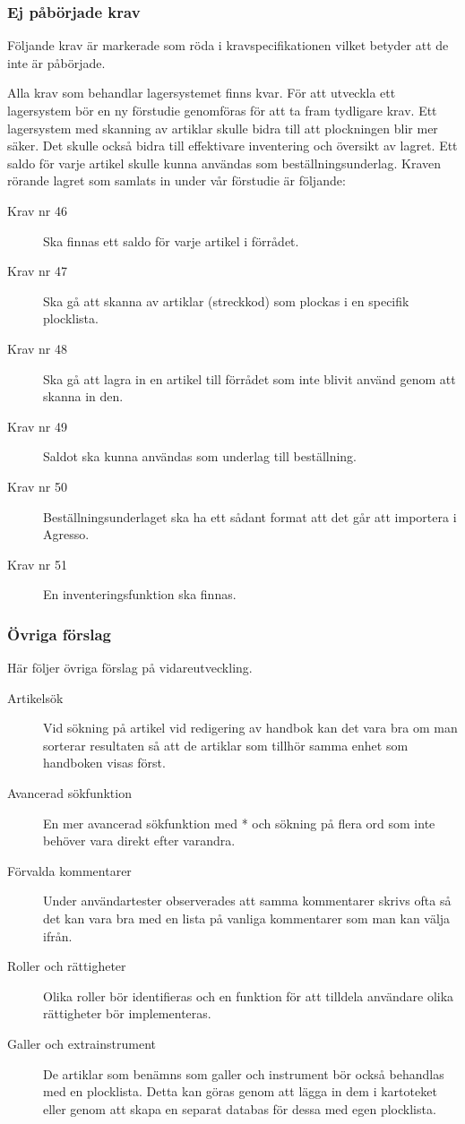 \documentclass{article}
\begin{document}
\subsubsection{Ej påbörjade krav}
Följande krav är markerade som röda i kravspecifikationen vilket betyder att de inte är påbörjade.

Alla krav som behandlar lagersystemet finns kvar. För att utveckla ett lagersystem bör en ny förstudie genomföras för att ta fram tydligare krav. Ett lagersystem med skanning av artiklar skulle bidra till att plockningen blir mer säker. Det skulle också bidra till effektivare inventering och översikt av lagret. Ett saldo för varje artikel skulle kunna användas som beställningsunderlag. Kraven rörande lagret som samlats in under vår förstudie är följande:
\begin{description}
\item[Krav nr 46] Ska finnas ett saldo för varje artikel i förrådet.
\item[Krav nr 47] Ska gå att skanna av artiklar (streckkod) som plockas i en specifik plocklista.
\item[Krav nr 48] Ska gå att lagra in en artikel till förrådet som inte blivit använd genom att skanna in den.
\item[Krav nr 49] Saldot ska kunna användas som underlag till beställning.
\item[Krav nr 50] Beställningsunderlaget ska ha ett sådant format att det går att importera i Agresso.
\item[Krav nr 51] En inventeringsfunktion ska finnas.
\end{description}

\subsubsection{Övriga förslag}
Här följer övriga förslag på vidareutveckling.

\begin{description}
\item[Artikelsök] Vid sökning på artikel vid redigering av handbok kan det vara bra om man sorterar resultaten så att de artiklar som tillhör samma enhet som handboken visas först.
\item[Avancerad sökfunktion] En mer avancerad sökfunktion med * och sökning på flera ord som inte behöver vara direkt efter varandra.
\item[Förvalda kommentarer] Under användartester observerades att samma kommentarer skrivs ofta så det kan vara bra med en lista på vanliga kommentarer som man kan välja ifrån.
\item[Roller och rättigheter] Olika roller bör identifieras och en funktion för att tilldela användare olika rättigheter bör implementeras.
\item[Galler och extrainstrument] De artiklar som benämns som galler och instrument bör också behandlas med en plocklista. Detta kan göras genom att lägga in dem i kartoteket eller genom att skapa en separat databas för dessa med egen plocklista.
\end{description}

\end{document}
